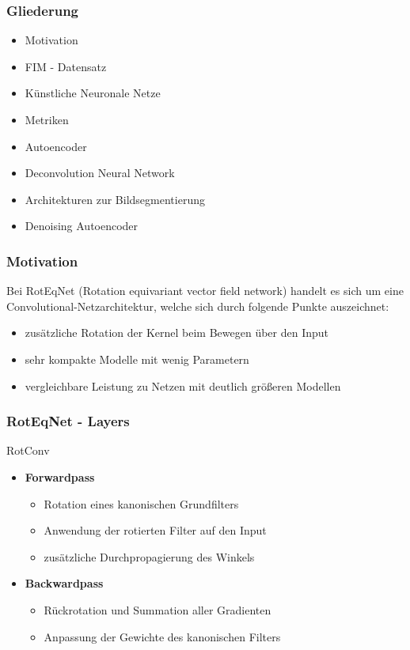 \begin{frame}
	\frametitle{Gliederung}
	\begin{itemize}
		\item Motivation
		\item FIM - Datensatz
		\item Künstliche Neuronale Netze
		\item Metriken
		\item Autoencoder
		\item Deconvolution Neural Network
		\item Architekturen zur Bildsegmentierung
		\item Denoising Autoencoder
	\end{itemize}
\end{frame}

\begin{frame}
	\frametitle{Motivation}
	Bei RotEqNet (Rotation equivariant vector field network) handelt es sich um eine Convolutional-Netzarchitektur, welche sich durch folgende Punkte auszeichnet:
	\begin{itemize}
		\item zusätzliche Rotation der Kernel beim Bewegen über den Input
		\item sehr kompakte Modelle mit wenig Parametern
		\item vergleichbare Leistung zu Netzen mit deutlich größeren Modellen
		
	\end{itemize}
\end{frame}

\begin{frame}
	\frametitle{RotEqNet - Layers}
	\begin{block}{RotConv}
		\begin{itemize}
			\item[] \textbf{Forwardpass}
			\begin{itemize}
				\item Rotation eines kanonischen Grundfilters
				\item Anwendung der rotierten Filter auf den Input
				\item zusätzliche Durchpropagierung des Winkels
			\end{itemize}
			\item[] \textbf{Backwardpass}
			\begin{itemize}
				\item Rückrotation und Summation aller Gradienten
				\item Anpassung der Gewichte des kanonischen Filters
			\end{itemize}
		\end{itemize}
	\end{block}
\end{frame}


